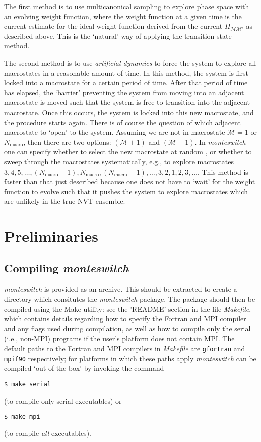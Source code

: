 \documentclass{report}
\begin{document}
The first method is to use multicanonical sampling to explore phase space with an evolving weight function, where the weight function
at a given time is the current estimate for the ideal weight function derived from the current $H_{\mathcal{M}\mathcal{M}'}$ as described above.
This is the `natural' way of applying the transition state method.

The second method is to use \emph{artificial dynamics} to force the system to explore all macrostates in a reasonable amount of time. In this
method, the system is first locked into a macrostate for a certain period of time. After that period of time has elapsed, the `barrier' preventing
the system from moving into an adjacent macrostate is moved such that the system is free to transition into the adjacent macrostate. Once this occurs,
the system is locked into this new macrostate, and the procedure starts again. There is of course the question of which adjacent macrostate to `open'
to the system. Assuming we are not in macrostate $\mathcal{M}=1$ or $N_{\text{macro}}$, then there are two options: $(\mathcal{M}+1)$ and $(\mathcal{M}-1)$.
In \emph{monteswitch} one can specify whether to select the new macrostate at random \cite{thesis:Jackson}, 
or whether to sweep through the macrostates systematically, e.g.,
to explore macrostates $3,4,5,\dotsc,(N_{\text{macro}}-1),N_{\text{macro}},(N_{\text{macro}}-1),\dotsc,3,2,1,2,3,\dotsc$. This method is faster than that
just described because one does not have to `wait' for the weight function to evolve such that it pushes the system to explore macrostates which
are unlikely in the true NVT ensemble.


\chapter{Preliminaries}\label{chapter:preliminaries}

\section{Compiling \emph{monteswitch}}
\emph{monteswitch} is provided as an archive. This should be extracted to create a directory which consitutes the \emph{monteswitch} package. The 
package should then be compiled using the Make utility: see the 'README' section in the file \emph{Makefile}, which contains details regarding how to
specify the Fortran and MPI compiler and any flags used during compilation, as well as how to compile only the serial (i.e., non-MPI) programs
if the user's platform does not contain MPI.
The default paths to the Fortran and MPI compilers in \emph{Makefile} are \texttt{gfortran} and \texttt{mpif90} respectively; for platforms in which
these paths apply \emph{monteswitch} can be compiled `out of the box' by invoking the command 
\begin{verbatim}
$ make serial
\end{verbatim} 
(to compile only serial executables) or 
\begin{verbatim}
$ make mpi
\end{verbatim}
(to compile \emph{all} executables).
\end{document}
